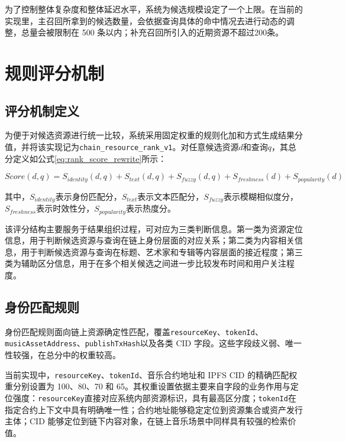 为了控制整体复杂度和整体延迟水平，系统为候选规模设定了一个上限。在当前的实现里，主召回所拿到的候选数量，会依据查询具体的命中情况去进行动态的调整，总量会被限制在 500 条以内；补充召回所引入的近期资源不超过200条。


\section{规则评分机制}

\subsection{评分机制定义}

为便于对候选资源进行统一比较，系统采用固定权重的规则化加和方式生成结果分值，并将该实现记为\texttt{chain\_resource\_rank\_v1}。对任意候选资源$d$和查询$q$，其总分定义如公式\eqref{eq:rank_score_rewrite}所示：

\begin{equation}
    Score(d,q)=S_{identity}(d,q)+S_{text}(d,q)+S_{fuzzy}(d,q)+S_{freshness}(d)+S_{popularity}(d)
    \label{eq:rank_score_rewrite}
\end{equation}

其中，$S_{identity}$表示身份匹配分，$S_{text}$表示文本匹配分，$S_{fuzzy}$表示模糊相似度分，$S_{freshness}$表示时效性分，$S_{popularity}$表示热度分。

该评分结构主要服务于结果组织过程，可对应为三类判断信息。第一类为资源定位信息，用于判断候选资源与查询在链上身份层面的对应关系；第二类为内容相关信息，用于判断候选资源与查询在标题、艺术家和专辑等内容层面的接近程度；第三类为辅助区分信息，用于在多个相关候选之间进一步比较发布时间和用户关注程度。

\subsection{身份匹配规则}

身份匹配规则面向链上资源确定性匹配，覆盖\texttt{resourceKey}、\texttt{tokenId}、\texttt{musicAssetAddress}、\texttt{publishTxHash}以及各类 CID 字段。这些字段歧义弱、唯一性较强，在总分中的权重较高。

当前实现中，\texttt{resourceKey}、\texttt{tokenId}、音乐合约地址和 IPFS CID 的精确匹配权重分别设置为 100、80、70 和 65。其权重设置依据主要来自字段的业务作用与定位强度：\texttt{resourceKey}直接对应系统内部资源标识，具有最高区分度；\texttt{tokenId}在指定合约上下文中具有明确唯一性；合约地址能够稳定定位到资源集合或资产发行主体；CID 能够定位到链下内容对象，在链上音乐场景中同样具有较强的检索价值。

